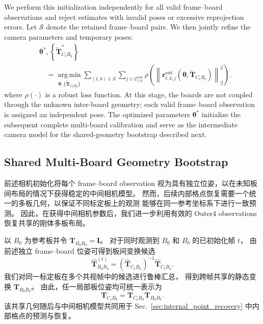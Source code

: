 \documentclass[letterpaper, 10 pt, conference]{ieeeconf}  %
\begin{document}
We perform this initialization independently for all valid frame--board
observations and reject estimates with invalid poses or excessive
reprojection errors. Let $\mathcal{S}$ denote the retained frame--board
pairs. We then jointly refine the camera parameters and temporary poses:
\begin{equation}
\begin{aligned}
&\boldsymbol{\theta}^{*},
\left\{
\widetilde{\mathbf{T}}^{*}_{C_tB_b}
\right\}
\\
&\quad =
\operatorname*{arg\,min}_{
\boldsymbol{\theta},
\{\widetilde{\mathbf{T}}_{C_tB_b}\}}
\sum_{(t,b)\in\mathcal{S}}
\sum_{j\in\mathcal{C}^{\mathrm{out}}_{t,b}}
\rho\!\left(
\left\|
\mathbf{r}^{\mathrm{out}}_{t,b,j}
\left(
\boldsymbol{\theta},
\widetilde{\mathbf{T}}_{C_tB_b}
\right)
\right\|_2^2
\right).
\end{aligned}
\end{equation}
where $\rho(\cdot)$ is a robust loss function. At this stage, the boards
are not coupled through the unknown inter-board geometry; each valid
frame--board observation is assigned an independent pose. The optimized
parameters $\boldsymbol{\theta}^{*}$ initialize the subsequent complete
multi-board calibration and serve as the intermediate camera model for
the shared-geometry bootstrap described next.

\subsection{Shared Multi-Board Geometry Bootstrap}
\label{sec:multi_board_bootstrap}

前述相机初始化将每个 frame--board observation
视为具有独立位姿，以在未知板间布局的情况下获得稳定的中间相机模型。
然而，后续内部格点恢复需要一个统一的多板几何，以保证不同标定板上的观测
能够在同一参考坐标系下进行一致预测。
因此，在获得中间相机参数后，我们进一步利用有效的 Outer4 observations
恢复共享的刚体多板布局。

以 $B_0$ 为参考板并令
$\mathbf{T}_{B_0B_0}=\mathbf{I}$。
对于同时观测到 $B_0$ 和 $B_b$ 的已初始化帧 $t$，
由前述独立 frame--board 位姿可得到板间变换候选
\begin{equation}
\widehat{\mathbf{T}}_{B_0B_b}^{(t)}
=
\left(
\widehat{\mathbf{T}}_{C_tB_0}
\right)^{-1}
\widehat{\mathbf{T}}_{C_tB_b}.
\end{equation}
我们对同一标定板在多个共视帧中的候选进行鲁棒汇总，
得到跨帧共享的静态变换 $\mathbf{T}_{B_0B_b}$。
由此，任一局部板位姿均可统一表示为
\begin{equation}
\mathbf{T}_{C_tB_b}
=
\mathbf{T}_{C_tB_0}
\mathbf{T}_{B_0B_b}.
\end{equation}
该共享几何随后与中间相机模型共同用于
Sec.~\ref{sec:internal_point_recovery} 中内部格点的预测与恢复。
\end{document}
